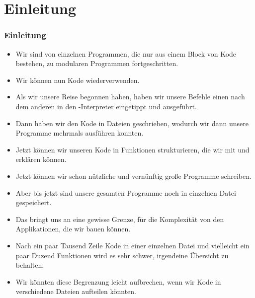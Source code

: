 \documentclass[aspectratio=169,mathserif,notheorems]{beamer}%
\subtitle{27.~Funktionen in Modulen}%
\begin{document}
%
%
\startPresentation%
%
\section{Einleitung}%
\begin{frame}%
\frametitle{Einleitung}%
\begin{itemize}%
%
%
%
\item<2-> Wir sind von einzelnen Programmen, die nur aus einem Block von Kode bestehen, zu modularen Programmen fortgeschritten.%
%
\item<3-> Wir können nun Kode wiederverwenden.%
%
\item<4-> Als wir unsere Reise begonnen haben, haben wir unsere Befehle einen nach dem anderen in den \python-Interpreter eingetippt und ausgeführt.%
%
\item<5-> Dann haben wir den Kode in Dateien geschrieben, wodurch wir dann unsere Programme mehrmals ausführen konnten.%
%
\item<6-> Jetzt können wir unseren Kode in Funktionen strukturieren, die wir mit  und  erklären können.%
%
\item<7-> Jetzt können wir schon nützliche und vernünftig große Programme schreiben.%
%
\item<8-> Aber bis jetzt sind unsere gesamten Programme noch in einzelnen Datei gespeichert.%
%
\item<9-> Das bringt uns an eine gewisse Grenze, für die Komplexität von den Applikationen, die wir bauen können.%
%
\item<10-> Nach ein paar Tausend Zeile Kode in einer einzelnen Datei und vielleicht ein paar Duzend Funktionen wird es sehr schwer, irgendeine Übersicht zu behalten.%
%
\item<11-> Wir könnten diese Begrenzung leicht aufbrechen, wenn wir Kode in verschiedene Dateien aufteilen könnten.%
%
\end{itemize}%
\end{frame}%
%
\end{document}
